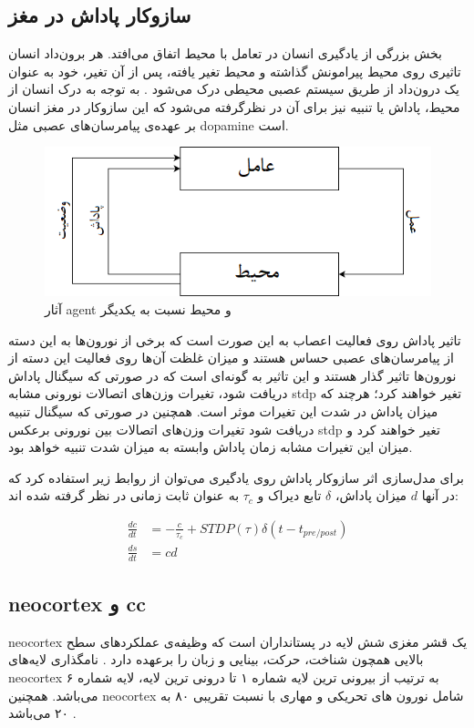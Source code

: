 \documentclass[12pt]{report}
\begin{document}
	\subsection{سازوکار پاداش در مغز}
	\label{section:reward-in-brain}
	
	بخش بزرگی از یادگیری انسان در تعامل با محیط اتفاق می‌افتد. هر برون‌داد انسان تاثیری روی محیط پیرامونش گذاشته و محیط تغیر یافته، پس از آن تغیر، خود به عنوان یک درون‌داد از طریق سیستم عصبی محیطی درک می‌شود
	\cite{sutton1998reinforcement}.
	به توجه به درک انسان از محیط، پاداش یا تنبیه نیز برای آن در نظرگرفته می‌شود که این ساز‌و‌کار در مغز انسان بر عهده‌ی پیامرسان‌های عصبی  مثل \gls{dopamine} است. 
	
	\begin{figure}[H]
		\centering
		\includegraphics[width=0.7\linewidth]{rl.png}
		\caption[NS]{
			آثار \gls{agent} و محیط نسبت به یکدیگر
		}
		\label{fig:rl}
	\end{figure}
	
	تاثیر پاداش روی فعالیت اعصاب به این صورت است که برخی از نورون‌ها به این دسته از پیامرسان‌‌های عصبی حساس هستند و میزان غلظت آن‌ها روی فعالیت این دسته از نورون‌ها تاثیر گذار هستند و این تاثیر به گونه‌ای است که در صورتی که سیگنال پاداش دریافت شود، تغیرات وزن‌های اتصالات نورونی مشابه \gls{stdp} تغیر خواهند کرد؛ هرچند که میزان پاداش در شدت این تغیرات موثر است. همچنین در صورتی که سیگنال تنبیه دریافت شود تغیرات وزن‌های اتصالات بین نورونی برعکس \gls{stdp} تغیر خواهند کرد و میزان این تغیرات مشابه زمان پاداش وابسته به میزان شدت تنبیه خواهد بود.
	
	برای مدل‌سازی اثر سازوکار پاداش روی یادگیری می‌توان از روابط زیر استفاده کرد که در آنها $d$ میزان پاداش، $\delta$ تابع دیراک و $\tau_c$ به عنوان ثابت زمانی در نظر گرفته شده اند:
	
	\begin{align}
		\frac{dc}{dt} &= -\frac{c}{\tau_c} + STDP(\tau) \delta(t-t_{pre/post}) \\
		\frac{ds}{dt} &= cd
		\label{eq:rstdp}
	\end{align}
	
	
	\subsection{\gls{neocortex} و \gls{cc}}
	\gls{neocortex} یک قشر مغزی شش لایه در پستانداران است که وظیفه‌ی عملکرد‌های سطح بالایی همچون شناخت، حرکت، بینایی و زبان را برعهده دارد
	\cite{Lui2011}. نامگذاری لایه‌های \gls{neocortex} به ترتیب از بیرونی ترین لایه شماره ۱ تا درونی ترین لایه، لایه شماره ۶ می‌باشد.
	همچنین \gls{neocortex} شامل نورون های تحریکی و مهاری با نسبت تقریبی ۸۰ به ۲۰ می‌باشد
	\cite{noback2005human}.
	
\end{document}
